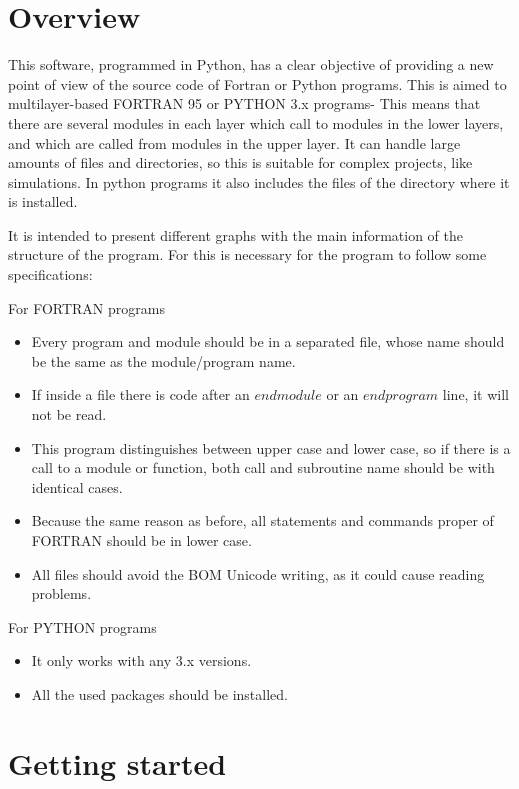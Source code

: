 \section*{Overview}


This software, programmed in Python, has a clear objective of providing a new point of view of the source code of Fortran or Python programs. This is aimed to multilayer-based FORTRAN 95 or PYTHON 3.x programs- This means that there are several modules in each layer which call to modules in the lower layers, and which are called from modules in the upper layer. It can handle large amounts of files and directories, so this is suitable for complex projects, like simulations. In python programs it also includes the files of the directory where it is installed. 

It is intended to present different graphs with the main information of the structure of the program. For this is necessary for the program to follow some specifications:

For FORTRAN programs
\begin{itemize}
    \item Every program and module should be in a separated file, whose name should be the same as the module/program name.
    \item If inside a file there is code after an $ end module $ or an $ end program $ line, it will not be read.
    \item This program distinguishes between upper case and lower case, so if there is a call to a module or function, both call and subroutine name should be with identical cases.
    \item Because the same reason as before, all statements and commands proper of FORTRAN should be in lower case.
    \item All files should avoid the BOM Unicode writing, as it could cause reading problems.
\end{itemize}

For PYTHON programs
\begin{itemize}
    \item It only works with any 3.x versions.
    \item All the used packages should be installed.
   \end{itemize}


\section*{Getting started}


